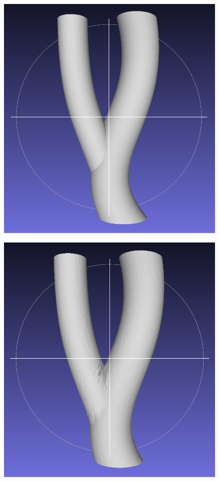 \documentclass[11p, titlepage]{article}
\newcommand{\reconstructionleft}{0.3}
\newcommand{\reconstructionright}{0.67}
\begin{document}
\begin{figure}[h!]
     \centering
     \begin{minipage}[b]{\reconstructionleft\linewidth}
       {\includegraphics[width=\linewidth]{originals/simple-branch}}%
     \end{minipage}%
     \hfill
     \begin{minipage}[b]{\reconstructionright\linewidth}
       {\includegraphics[width=0.48\linewidth]{reconstructions/dtw-simple-branch-30}}%
       \hfill

\end{minipage}
\end{figure}
\end{document}
